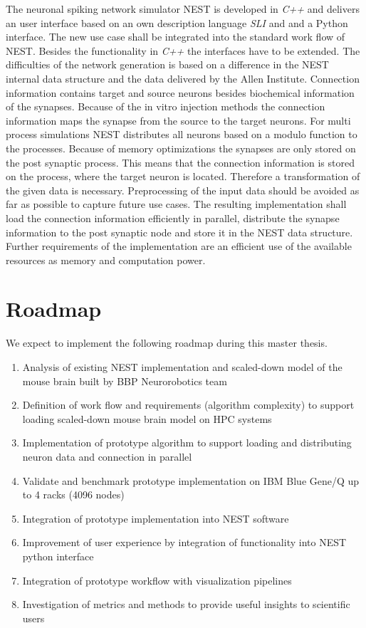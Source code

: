 \documentclass[a4paper]{article}
\begin{document}
The neuronal spiking network simulator NEST is developed in \emph{C++} and delivers
an user interface based on an own description language \emph{SLI} and  and a Python interface.
The new use case shall be integrated into the standard work flow of NEST.
Besides the functionality in \emph{C++} the interfaces have to be extended.
The difficulties of the network generation is based on a difference in 
the NEST internal data structure and the data delivered by the Allen Institute.
Connection information contains target and source neurons besides biochemical
information of the synapses. Because of the in vitro injection methods the
connection information maps the synapse from the source to the target neurons.
For multi process simulations NEST distributes all neurons based on a modulo function 
to the processes. Because of memory optimizations the synapses are only stored on the
post synaptic process. This means that the connection information is stored
on the process, where the target neuron is located. Therefore a transformation of the given data is
necessary. Preprocessing of the input data should be avoided as far as possible to capture
future use cases.
The resulting implementation shall load the connection information efficiently in parallel,
distribute the synapse information to the post synaptic node and store it in
the NEST data structure.
Further requirements of the implementation are an efficient use of the available resources as
memory and computation power. 

\newpage
\section{Roadmap}
We expect to implement the following roadmap during this master thesis.
\begin{enumerate}
    \item Analysis of existing NEST implementation and scaled-down model of the mouse brain built by BBP Neurorobotics team
	\item Definition of work flow and requirements (algorithm complexity) to support loading scaled-down mouse brain model on HPC systems
	\item Implementation of prototype algorithm to support loading and distributing neuron data and connection in parallel
	\item Validate and benchmark prototype implementation on IBM Blue Gene/Q up to 4 racks (4096 nodes)
	\item Integration of prototype implementation into NEST software
	\item Improvement of user experience by integration of functionality into NEST python interface
	\item Integration of prototype workflow with visualization pipelines 
	\item Investigation of metrics and  methods to provide useful insights to scientific users

\end{enumerate}
\end{document}
